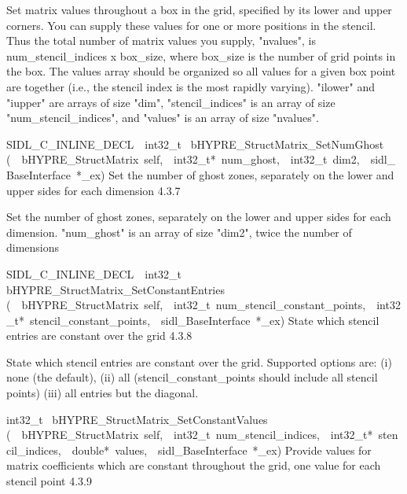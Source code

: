 \documentclass{article}
\begin{document}
\begin{cxxentry}
\begin{cxxentry}
\begin{cxxfunction}
\begin{cxxdoc}
Set matrix values throughout a box in the grid, specified by its lower
and upper corners.  You can supply these values for one or more positions
in the stencil.  Thus the total number of matrix values you supply,
"nvalues", is num\_stencil\_indices x box\_size, where box\_size is the
number of grid points in the box.  The values array should be organized
so all values for a given box point are together (i.e., the stencil
index is the most rapidly varying).
"ilower" and "iupper" are arrays of size "dim", "stencil\_indices" is an
array of size "num\_stencil\_indices", and "values" is an array of size
"nvalues". 
\end{cxxdoc}
\end{cxxfunction}
\begin{cxxfunction}
{SIDL\_C\_INLINE\_DECL\ \ int32\_t\ }
        {bHYPRE\_StructMatrix\_SetNumGhost}
        {(\ \ bHYPRE\_StructMatrix\ self,\ \ int32\_t*\ num\_ghost,\ \ int32\_t\ dim2,\ \ sidl\_BaseInterface\ *\_ex)}
        {
Set the number of ghost zones, separately on the lower and upper sides
for each dimension}
        {4.3.7}
\begin{cxxdoc}

Set the number of ghost zones, separately on the lower and upper sides
for each dimension.
"num\_ghost" is an array of size "dim2", twice the number of dimensions
\end{cxxdoc}
\end{cxxfunction}
\begin{cxxfunction}
{SIDL\_C\_INLINE\_DECL\ \ int32\_t\ }
        {bHYPRE\_StructMatrix\_SetConstantEntries}
        {(\ \ bHYPRE\_StructMatrix\ self,\ \ int32\_t\ num\_stencil\_constant\_points,\ \ int32\_t*\ stencil\_constant\_points,\ \ sidl\_BaseInterface\ *\_ex)}
        {
State which stencil entries are constant over the grid}
        {4.3.8}
\begin{cxxdoc}

State which stencil entries are constant over the grid.
Supported options are: (i) none (the default),
(ii) all (stencil\_constant\_points should include all stencil points)
(iii) all entries but the diagonal. 
\end{cxxdoc}
\end{cxxfunction}
\begin{cxxfunction}
{int32\_t\ }
        {bHYPRE\_StructMatrix\_SetConstantValues}
        {(\ \ bHYPRE\_StructMatrix\ self,\ \ int32\_t\ num\_stencil\_indices,\ \ int32\_t*\ stencil\_indices,\ \ double*\ values,\ \ sidl\_BaseInterface\ *\_ex)}
        {
Provide values for matrix coefficients which are constant throughout
the grid, one value for each stencil point}
        {4.3.9}
\begin{cxxdoc}


\end{cxxdoc}
\end{cxxfunction}
\end{cxxentry}
\end{cxxentry}
\end{document}
